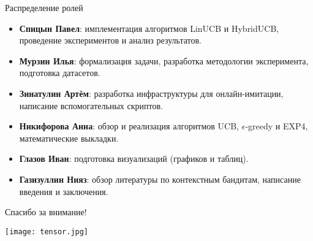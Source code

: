 \documentclass[10pt]{beamer}
\begin{document}
\begin{frame}{Распределение ролей}
  \begin{itemize}
    \item \textbf{Спицын Павел}: имплементация алгоритмов LinUCB и HybridUCB, проведение экспериментов и анализ результатов.
    \item \textbf{Мурзин Илья}: формализация задачи, разработка методологии эксперимента, подготовка датасетов.
    \item \textbf{Зинатулин Артём}: разработка инфраструктуры для онлайн-имитации, написание вспомогательных скриптов.
    \item \textbf{Никифорова Анна}: обзор и реализация алгоритмов UCB, $\epsilon$-greedy и EXP4, математические выкладки.
    \item \textbf{Глазов Иван}: подготовка визуализаций (графиков и таблиц).
    \item \textbf{Газизуллин Нияз}: обзор литературы по контекстным бандитам, написание введения и заключения.
  \end{itemize}
\end{frame}
\begin{frame}{Спасибо за внимание!}
  \begin{center}
    \texttt{[image: tensor.jpg]}
  \end{center}
\end{frame}
\end{document}
